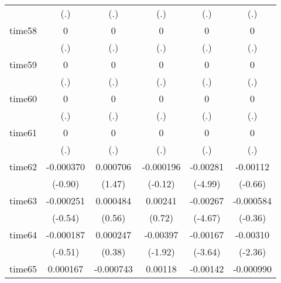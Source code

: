 \begin{table}[htbp]
\begin{tabular}{l*{5}{c}}
            &         (.)         &         (.)         &         (.)         &         (.)         &         (.)         \\
time58      &           0         &           0         &           0         &           0         &           0         \\
            &         (.)         &         (.)         &         (.)         &         (.)         &         (.)         \\
time59      &           0         &           0         &           0         &           0         &           0         \\
            &         (.)         &         (.)         &         (.)         &         (.)         &         (.)         \\
time60      &           0         &           0         &           0         &           0         &           0         \\
            &         (.)         &         (.)         &         (.)         &         (.)         &         (.)         \\
time61      &           0         &           0         &           0         &           0         &           0         \\
            &         (.)         &         (.)         &         (.)         &         (.)         &         (.)         \\
time62      &   -0.000370         &    0.000706         &   -0.000196         &    -0.00281\sym{***}&    -0.00112         \\
            &     (-0.90)         &      (1.47)         &     (-0.12)         &     (-4.99)         &     (-0.66)         \\
time63      &   -0.000251         &    0.000484         &     0.00241         &    -0.00267\sym{***}&   -0.000584         \\
            &     (-0.54)         &      (0.56)         &      (0.72)         &     (-4.67)         &     (-0.36)         \\
time64      &   -0.000187         &    0.000247         &    -0.00397         &    -0.00167\sym{***}&    -0.00310\sym{*}  \\
            &     (-0.51)         &      (0.38)         &     (-1.92)         &     (-3.64)         &     (-2.36)         \\
time65      &    0.000167         &   -0.000743         &     0.00118         &    -0.00142\sym{*}  &   -0.000990         \\

\end{tabular}
\end{table}

